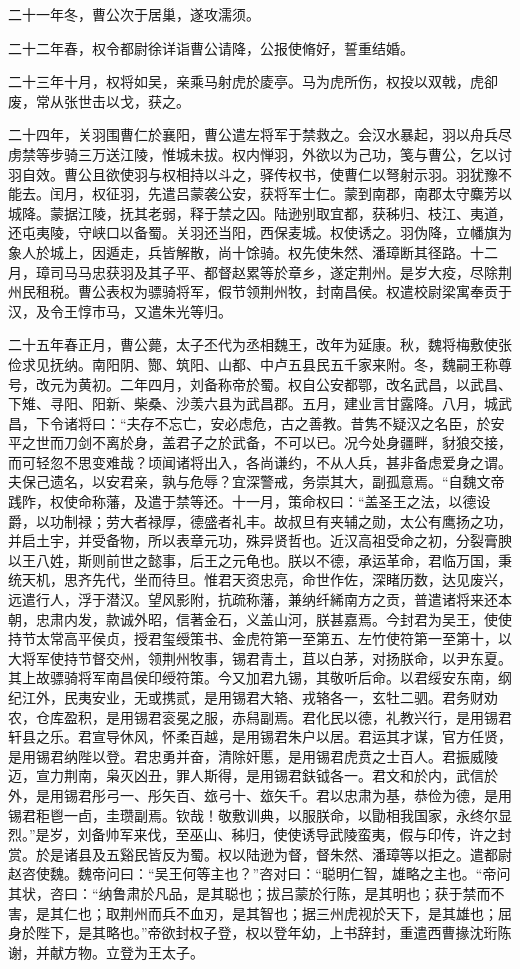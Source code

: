 \documentclass[12pt,UTF8]{ctexbook}
\begin{document}
二十一年冬，曹公次于居巢，遂攻濡须。

二十二年春，权令都尉徐详诣曹公请降，公报使脩好，誓重结婚。

二十三年十月，权将如吴，亲乘马射虎於庱亭。马为虎所伤，权投以双戟，虎卻废，常从张世击以戈，获之。

二十四年，关羽围曹仁於襄阳，曹公遣左将军于禁救之。会汉水暴起，羽以舟兵尽虏禁等步骑三万送江陵，惟城未拔。权内惮羽，外欲以为己功，笺与曹公，乞以讨羽自效。曹公且欲使羽与权相持以斗之，驿传权书，使曹仁以弩射示羽。羽犹豫不能去。闰月，权征羽，先遣吕蒙袭公安，获将军士仁。蒙到南郡，南郡太守麋芳以城降。蒙据江陵，抚其老弱，释于禁之囚。陆逊别取宜都，获秭归、枝江、夷道，还屯夷陵，守峡口以备蜀。关羽还当阳，西保麦城。权使诱之。羽伪降，立幡旗为象人於城上，因遁走，兵皆解散，尚十馀骑。权先使朱然、潘璋断其径路。十二月，璋司马马忠获羽及其子平、都督赵累等於章乡，遂定荆州。是岁大疫，尽除荆州民租税。曹公表权为骠骑将军，假节领荆州牧，封南昌侯。权遣校尉梁寓奉贡于汉，及令王惇市马，又遣朱光等归。

二十五年春正月，曹公薨，太子丕代为丞相魏王，改年为延康。秋，魏将梅敷使张俭求见抚纳。南阳阴、酂、筑阳、山都、中卢五县民五千家来附。冬，魏嗣王称尊号，改元为黄初。二年四月，刘备称帝於蜀。权自公安都鄂，改名武昌，以武昌、下雉、寻阳、阳新、柴桑、沙羡六县为武昌郡。五月，建业言甘露降。八月，城武昌，下令诸将曰：“夫存不忘亡，安必虑危，古之善教。昔隽不疑汉之名臣，於安平之世而刀剑不离於身，盖君子之於武备，不可以已。况今处身疆畔，豺狼交接，而可轻忽不思变难哉？顷闻诸将出入，各尚谦约，不从人兵，甚非备虑爱身之谓。夫保己遗名，以安君亲，孰与危辱？宜深警戒，务崇其大，副孤意焉。“自魏文帝践阼，权使命称藩，及遣于禁等还。十一月，策命权曰：“盖圣王之法，以德设爵，以功制禄；劳大者禄厚，德盛者礼丰。故叔旦有夹辅之勋，太公有鹰扬之功，并启土宇，并受备物，所以表章元功，殊异贤哲也。近汉高祖受命之初，分裂膏腴以王八姓，斯则前世之懿事，后王之元龟也。朕以不德，承运革命，君临万国，秉统天机，思齐先代，坐而待旦。惟君天资忠亮，命世作佐，深睹历数，达见废兴，远遣行人，浮于潜汉。望风影附，抗疏称藩，兼纳纤絺南方之贡，普遣诸将来还本朝，忠肃内发，款诚外昭，信著金石，义盖山河，朕甚嘉焉。今封君为吴王，使使持节太常高平侯贞，授君玺绶策书、金虎符第一至第五、左竹使符第一至第十，以大将军使持节督交州，领荆州牧事，锡君青土，苴以白茅，对扬朕命，以尹东夏。其上故骠骑将军南昌侯印绶符策。今又加君九锡，其敬听后命。以君绥安东南，纲纪江外，民夷安业，无或携贰，是用锡君大辂、戎辂各一，玄牡二驷。君务财劝农，仓库盈积，是用锡君衮冕之服，赤舄副焉。君化民以德，礼教兴行，是用锡君轩县之乐。君宣导休风，怀柔百越，是用锡君朱户以居。君运其才谋，官方任贤，是用锡君纳陛以登。君忠勇并奋，清除奸慝，是用锡君虎贲之士百人。君振威陵迈，宣力荆南，枭灭凶丑，罪人斯得，是用锡君鈇钺各一。君文和於内，武信於外，是用锡君彤弓一、彤矢百、玈弓十、玈矢千。君以忠肃为基，恭俭为德，是用锡君秬鬯一卣，圭瓒副焉。钦哉！敬敷训典，以服朕命，以勖相我国家，永终尔显烈。”是岁，刘备帅军来伐，至巫山、秭归，使使诱导武陵蛮夷，假与印传，许之封赏。於是诸县及五谿民皆反为蜀。权以陆逊为督，督朱然、潘璋等以拒之。遣都尉赵咨使魏。魏帝问曰：“吴王何等主也？”咨对曰：“聪明仁智，雄略之主也。“帝问其状，咨曰：“纳鲁肃於凡品，是其聪也；拔吕蒙於行陈，是其明也；获于禁而不害，是其仁也；取荆州而兵不血刃，是其智也；据三州虎视於天下，是其雄也；屈身於陛下，是其略也。”帝欲封权子登，权以登年幼，上书辞封，重遣西曹掾沈珩陈谢，并献方物。立登为王太子。
\end{document}
